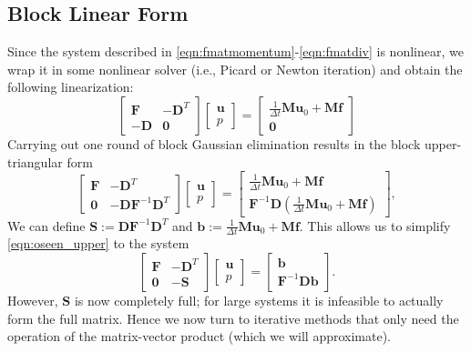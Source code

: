 \documentclass{article}
\newcommand{\mat}[1]{\bm{{#1}}}
\renewcommand{\vec}[1]{\bm{{#1}}}
\begin{document}
\subsection{Block Linear Form}
Since the system described in \eqref{eqn:fmatmomentum}-\eqref{eqn:fmatdiv} is nonlinear, we wrap it in some nonlinear solver (i.e., Picard or Newton iteration) and obtain the following linearization:
\begin{equation}
  \begin{bmatrix}
    \mat{F} & -\mat{D}^T \\
    -\mat{D} & \mat{0}
  \end{bmatrix}
  \begin{bmatrix}
    \vec{u} \\ p
  \end{bmatrix}
  =
  \begin{bmatrix}
    \frac{1}{\Delta t}\mat{M}\vec{u}_0 + \mat{M}\vec{f} \\ \mat{0}
  \end{bmatrix}
\end{equation}
Carrying out one round of block Gaussian elimination results in the block upper-triangular form
\begin{equation}
  \begin{bmatrix}
    \mat{F} & -\mat{D}^T \\
    \mat{0} & -\mat{D}\mat{F}^{-1}\mat{D}^T
  \end{bmatrix}
  \begin{bmatrix}
    \vec{u} \\ p
  \end{bmatrix}
  =
  \begin{bmatrix}
    \frac{1}{\Delta t}\mat{M}\vec{u}_0 + \mat{M}\vec{f} \\ \mat{F}^{-1}\mat{D}\left( \frac{1}{\Delta t}\mat{M}\vec{u}_0 + \mat{M}\vec{f}\right)
  \end{bmatrix}, \label{eqn:oseen_upper}
\end{equation}
We can define $\mat{S}:=\mat{D}\mat{F}^{-1}\mat{D}^T$ and $\vec{b}:=\frac{1}{\Delta t}\mat{M}\vec{u}_0 + \mat{M}\vec{f}$.  This allows us to simplify \eqref{eqn:oseen_upper} to the system
\begin{equation}
  \begin{bmatrix}
    \mat{F} & -\mat{D}^T \\
    \mat{0} & -\mat{S}
  \end{bmatrix}
  \begin{bmatrix}
    \vec{u} \\ p
  \end{bmatrix}
  =
  \begin{bmatrix}
    \vec{b} \\ \mat{F}^{-1}\mat{D}\vec{b}
  \end{bmatrix}. \label{eqn:oseen_schur}
\end{equation}
However, $\mat{S}$ is now completely full; for large systems it is infeasible to actually form the full matrix.  Hence we now turn to iterative methods that only need the operation of the matrix-vector product (which we will approximate).
\end{document}
